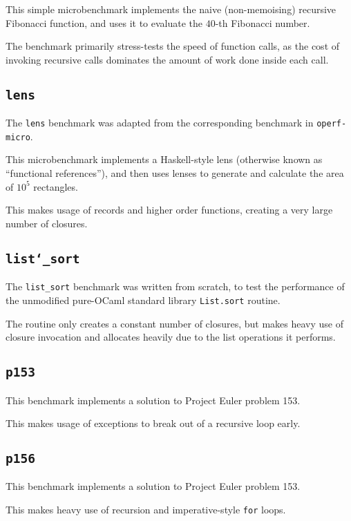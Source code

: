 \documentclass[12pt,a4paper,twoside,openright]{report}
\begin{document}
This simple microbenchmark implements the naive (non-memoising) recursive
Fibonacci function, and uses it to evaluate the $40$-th Fibonacci number.

The benchmark primarily stress-tests the speed of function calls, as the cost
of invoking recursive calls dominates the amount of work done inside each call.

\subsection{\texttt{lens}}

The \lstinline!lens! benchmark was adapted from the corresponding benchmark in
\lstinline!operf-micro!.

This microbenchmark implements a Haskell-style lens (otherwise known as
``functional references''), and then uses lenses to generate and calculate the
area of $10^5$ rectangles.

This makes usage of records and higher order functions, creating a very large
number of closures.

\subsection{\texttt{list\char`_sort}}

The \lstinline!list_sort! benchmark was written from scratch, to test the
performance of the unmodified pure-OCaml standard library \lstinline!List.sort!
routine.

The routine only creates a constant number of closures, but makes heavy use of
closure invocation and allocates heavily due to the list operations it
performs.

\subsection{\texttt{p153}}

This benchmark implements a solution to Project Euler problem 153.

This makes usage of exceptions to break out of a recursive loop early.

\subsection{\texttt{p156}}

This benchmark implements a solution to Project Euler problem 153.

This makes heavy use of recursion and imperative-style \lstinline!for! loops.
\end{document}
